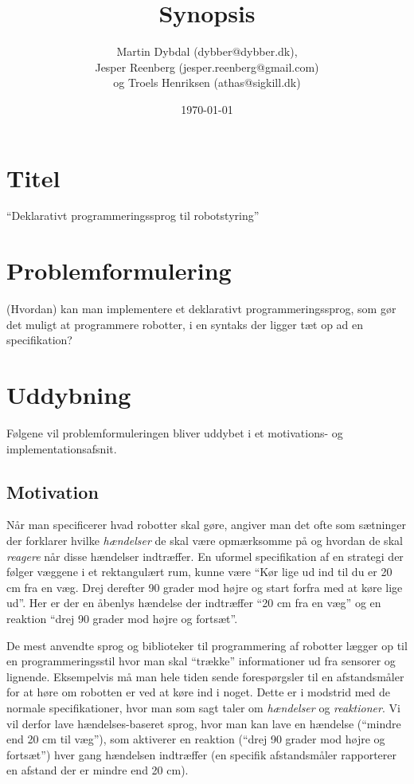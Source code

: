 \documentclass[a4paper,oneside, draft]{memoir}
\title{Synopsis}
\author{Martin Dybdal (dybber@dybber.dk), \\
Jesper Reenberg (jesper.reenberg@gmail.com) \\ og
Troels Henriksen (athas@sigkill.dk)}
\date{\today}
\begin{document}
\maketitle



\section{Titel}
"`Deklarativt programmeringssprog til robotstyring"'



\section{Problemformulering}
(Hvordan) kan man implementere et deklarativt programmeringssprog, som gør det
muligt at programmere robotter, i en syntaks der ligger tæt op ad en
specifikation?

\section{Uddybning}

Følgene vil problemformuleringen bliver uddybet i et motivations- og
implementationsafsnit.

\subsection{Motivation}
Når man specificerer hvad robotter skal gøre, angiver man det ofte som sætninger
der forklarer hvilke \textit{hændelser} de skal være opmærksomme på og hvordan
de skal \textit{reagere} når disse hændelser indtræffer. En uformel
specifikation af en strategi der følger væggene i et rektangulært rum, kunne
være "`Kør lige ud ind til du er 20 cm fra en væg. Drej derefter 90 grader mod
højre og start forfra med at køre lige ud"'. Her er der en åbenlys hændelse der
indtræffer "`20 cm fra en væg"' og en reaktion "`drej 90 grader mod højre og
fortsæt"'.

De mest anvendte sprog og biblioteker til programmering af robotter lægger op
til en programmeringsstil hvor man skal "`trække"' informationer ud fra sensorer
og lignende. Eksempelvis må man hele tiden sende forespørgsler til en
afstandsmåler for at høre om robotten er ved at køre ind i noget. Dette er i
modstrid med de normale specifikationer, hvor man som sagt taler om
\textit{hændelser} og \textit{reaktioner}. Vi vil derfor lave hændelses-baseret
sprog, hvor man kan lave en hændelse ("`mindre end 20 cm til væg"'), som
aktiverer en reaktion ("`drej 90 grader mod højre og fortsæt"') hver gang
hændelsen indtræffer (en specifik afstandsmåler rapporterer en afstand der er
mindre end 20 cm).
\end{document}
